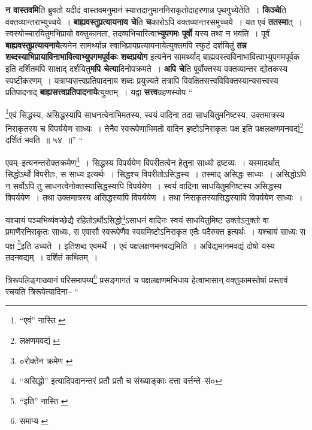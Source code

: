 \documentclass[article,12pt,a4paper]{memoir}
\begin{document}
	  \pstart \textbf{न वास्तवमि}ति ब्रुवतो यदीदं वास्तवमनुमानं स्यात्तदानुमाननिराकृतोदाहरणान्न पृथगुच्येतेति । \textbf{किञ्चे}ति वक्तव्यान्तराभ्युच्चये । \textbf{बाह्यवस्तुप्रत्यायनाय चे}ति \textbf{च}कारोऽपि वक्तव्यान्तरसमुच्चये । यत एवं \textbf{ततस्मा}त् । स्वस्योच्चारयितुमभिप्रायो वक्तुकामता, तदव्यभिचारित्वा\textbf{भ्युपगमः पूर्वो} यस्य तथा न भवति । पूर्वं \textbf{बाह्यवस्तुप्रत्यायनाये}त्यनेन सामर्थ्यान्न स्वाभिप्रायप्रत्यायनायेत्युक्तमपि स्फुटं दर्शयितुं \textbf{तन्न शब्दस्याभिप्रायाविनाभावित्वाभ्युपगमपूर्वकः शब्दप्रयोग} इत्यनेन सामर्थ्याद् बाह्मवस्त्वविनाभावित्वाभ्युपगमपूर्वक इति दर्शितमपि साक्षाद् दर्शयितु\textbf{मपि चेत्या}दिनोपक्रमते । \textbf{अपि चे}ति पूर्वोक्तस्य वक्तव्यान्तर द्योतकस्य स्पष्टीकरणम् । यत्राप्यसत्त्वप्रतिपादनाय शब्दः प्रयुज्यते तत्रापि विवक्षितसत्त्वविविक्तस्यान्यसत्त्वस्य प्रतिपादनाद् \textbf{बाह्यसत्त्वप्रतिपादनाये}त्युक्तम् । यद्वा \textbf{सत्त्व}ग्रहणस्योप  \leavevmode{} “
	  
	\footnote{“एवं” नास्ति \cite{dp-msB} \cite{dp-edP} \cite{dp-edH}}एवं सिद्धस्य, असिद्धस्यापि साधनत्वेनाभिमतस्य, स्वयं वादिना तदा साधयितुमनिष्टस्य, उक्तमात्रस्य निराकृतस्य च विपर्ययेण साध्यः । तेनैव स्वरूपेणाभिमतो वादिन इष्टोऽनिराकृतः पक्ष इति पक्षलक्षणमनवद्यं\footnote{लक्षणमवद्यं \cite{dp-msB} \cite{dp-edP}} दर्शितं भवति ॥ ५४ ॥” “
	  
	एवम्--इत्यनन्तरोक्तक्रमेण\footnote{०रोक्तेन क्रमेण \cite{dp-msB} \cite{dp-msC} \cite{dp-msD}} । सिद्धस्य विपर्ययेण विपरीतत्वेन हेतुना साध्यो द्रष्टव्यः । यस्मादर्थात् सिद्धोऽर्थो विपरीतः, स साध्य इत्यर्थः । सिद्धश्च विपरीतोऽसिद्धस्य । तस्माद् असिद्धः साध्यः । असिद्धोऽपि न सर्वोऽपि तु साधनत्वेनोक्तस्यासिद्धस्यापि विपर्ययेण । स्वर्य वादिना साधयितुमनिष्टस्य असिद्धस्य विपर्ययेण । तथा उक्तमात्रस्य असिद्धस्यापि विपर्ययेण । तथा निराकृतस्यासिद्धस्यापि विपर्ययेण साध्यः । 
	  
	यश्चायं पञ्चभिर्व्यवच्छेद्यै रहितोऽर्थोऽसिद्धो\footnote{“असिद्धो” इत्यादिपदानन्तरं \cite{dp-msA} प्रतौ \cite{dp-msD} प्रतौ च संख्याङ्काः दत्ता वर्त्तन्ते--सं०}ऽसाधनं वादिनः स्वयं साधयितुमिष्ट उक्तोऽनुक्तो वा प्रमाणैरनिराकृतः साध्यः, स एवासौ स्वरूपेणैव स्वयमिष्टोऽनिराकृत एतैः पदैरुक्त इत्यर्थः । यश्चायं साध्यः स पक्ष \footnote{“इति” नास्ति \cite{dp-msA} \cite{dp-msB} \cite{dp-msD} \cite{dp-edP} \cite{dp-edH} \cite{dp-edE} \cite{dp-edN}}इति उच्यते । इतिशब्द एवमर्थे । एवं पक्षलक्षणमनवद्यमिति । अविद्यमानमवद्यं दोषो यस्य तदनवद्यम् । दर्शितं कथितम् । 
	  
	त्रिरूपलिङ्गाख्यानं परिसमापय्य\footnote{समाप्य \cite{dp-edE}} प्रसङ्गागतं च पक्षलक्षणमभिधाय हेत्वाभासान् वक्तुकामस्तेषां प्रस्तावं रचयति त्रिरूपेत्यादिना-- “
	  
\end{document}
